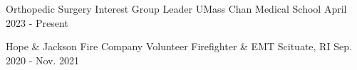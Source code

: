 

\begin{cventries}

\vspace{-1mm}
\cventry
  {Orthopedic Surgery Interest Group} %
  {Leader} %
  {UMass Chan Medical School} %
  {April 2023 - Present} %
  {}

\vspace{-4mm}

  \cventry
    {Hope \& Jackson Fire Company} %
    {Volunteer Firefighter \& EMT} %
    {Scituate, RI} %
    {Sep. 2020 - Nov. 2021} %
    {}

\vspace{-4mm}
\end{cventries}
